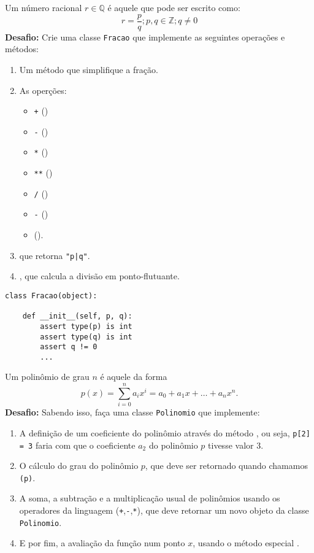 \documentclass[12pt]{article}
\begin{document}
	Um número racional $r \in \mathbb{Q}$ é aquele que pode ser escrito como: 
	\[r = \frac{p}{q} ; p,q \in \mathbb{Z} ; q \neq 0\]
	\textbf{Desafio:} Crie uma classe \texttt{Fracao} que implemente as seguintes operações e métodos:
	\begin{enumerate}
		\item Um método que simplifique a fração.
		\item As operções:
		\begin{itemize}
			\item \texttt{+} ()
			\item \texttt{-} ()
			\item \texttt{*} ()
			\item \texttt{**} ()
			\item \texttt{/} ()
			\item \texttt{-} ()
			\item \texttt{\til} ().
		\end{itemize}
		\item {} que retorna \texttt{"p|q"}.
		\item {}, que calcula a divisão em ponto-flutuante.
	\end{enumerate}

	\begin{lstlisting}
class Fracao(object):
    
    def __init__(self, p, q):
        assert type(p) is int
        assert type(q) is int
        assert q != 0
        ...	        
	\end{lstlisting}
	
	Um polinômio de grau $n$ é aquele da forma
	\[p(x) = \sum_{i=0}^{n} a_{i} x^{i}=a_{0} + a_{1}x + \dots + a_{n} x^{n}.\]
	\textbf{Desafio:} Sabendo isso, faça uma classe \texttt{Polinomio} que implemente:
	\begin{enumerate}
		\item A definição de um coeficiente do polinômio através do método , ou seja, \texttt{p[2] = 3} faria com que o coeficiente $a_{2}$ do polinômio $p$ tivesse valor $3$.
		
		\item O cálculo do grau do polinômio $p$, que deve ser retornado quando chamamos \texttt{(p)}.
		
		\item A soma, a subtração e a multiplicação usual de polinômios usando os operadores da linguagem (\texttt{+},\texttt{-},\texttt{*}), que deve retornar um novo objeto da classe \texttt{Polinomio}.
		
		\item E por fim, a avaliação da função num ponto $x$, usando o método especial .
	\end{enumerate}
	
\end{document}
